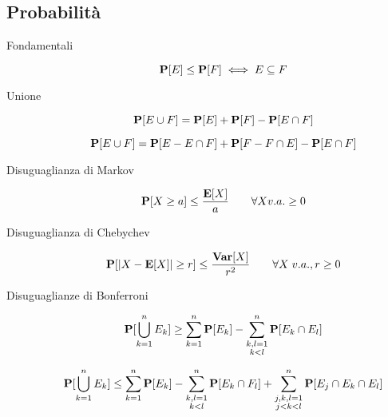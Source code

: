 \subsection{Probabilità}
\begin{description}
	
	\item[Fondamentali]
	\begin{equation}
	\mathbf{P}[E]\leq\mathbf{P}[F]\iff E\subseteq F
	\end{equation}
	
	\item[Unione]
	\begin{equation}
	\mathbf{P}[E \cup F] = \mathbf{P}[E]+\mathbf{P}[F]-\mathbf{P}[E \cap F]
	\end{equation}
	
	\begin{equation}
	\mathbf{P}[E \cup F] = \mathbf{P}[E-E\cap F]+\mathbf{P}[F-F\cap E]-\mathbf{P}[E \cap F]
	\end{equation}
	
	\item [Disuguaglianza di Markov]
	\begin{equation}
	\mathbf{P}[X \geq a] \leq \frac{\mathbf{E}[X]}{a}
	\qquad
	\forall X v.a. \geq 0
	\end{equation}
	
	\item [Disuguaglianza di Chebychev]
	\begin{equation}
	\mathbf{P}[|X-\mathbf{E}[X]| \geq r] \leq \frac{\mathbf{Var}[X]}{r^{2}}
	\qquad
	\forall X \; v.a., r \geq 0
	\end{equation}
	
	\item [Disuguaglianze di Bonferroni]
	\begin{equation}
	\mathbf{P}[\bigcup_{k=1}^{n}E_{k}] \geq \sum_{k=1}^{n}\mathbf{P}[E_{k}]-\sum_{\substack{k,l=1\\k<l}}^{n}\mathbf{P}[E_{k}\cap E_{l}]
	\end{equation}
	
	\begin{equation}
	\mathbf{P}[\bigcup_{k=1}^{n}E_{k}] \leq \sum_{k=1}^{n}\mathbf{P}[E_{k}]
	-\sum_{\substack{k,l=1\\k<l}}^{n}\mathbf{P}[E_{k}\cap F_{l}]
	+\sum_{\substack{j,k,l=1\\j<k<l}}^{n}\mathbf{P}[E_{j}\cap E_{k}\cap E_{l}]
	\end{equation}
	

\end{description}
